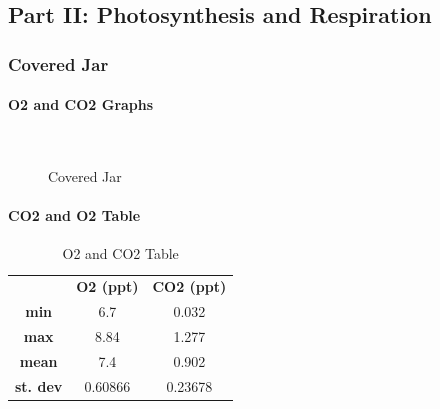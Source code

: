 \documentclass[a4paper, 12pt, english]{article}
\begin{document}
\subsection{Part II: Photosynthesis and Respiration}
\subsubsection{Covered Jar}
\paragraph{O2 and CO2 Graphs}

\begin{figure}[H]
	\centering
	\\
	\qquad
	\qquad
	\caption{Covered Jar}
	\label{fig:CoveredJar}
\end{figure}

\paragraph{CO2 and O2 Table}

\begin{table}[H]
	\caption{\label{tab:Table 1} O2 and CO2 Table}
	\centering
	\begin{tabular}{c c c}
		\toprule
		                 & \textbf{O2 (ppt)}
		                 & \textbf{CO2 (ppt)}           \\
		\cmidrule[0.4pt](r{0.125em}){1-1}%
		\cmidrule[0.4pt](lr{0.125em}){2-2}%
		\cmidrule[0.4pt](lr{0.125em}){3-3}%
		\textbf{min}     & 6.7                & 0.032   \\
		\textbf{max}     & 8.84               & 1.277   \\
		\textbf{mean}    & 7.4                & 0.902   \\
		\textbf{st. dev} & 0.60866            & 0.23678
	\end{tabular}
\end{table}
\end{document}
